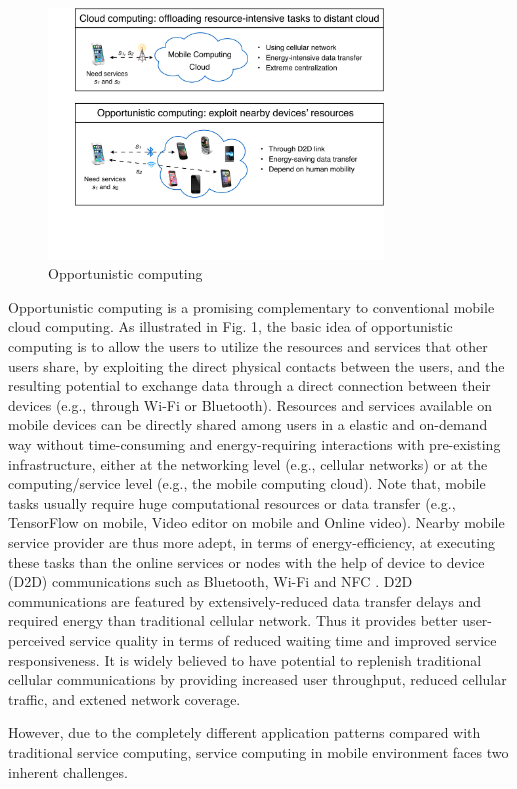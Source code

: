 \documentclass[journal]{IEEEtran}
\begin{document}
\begin{figure}[!t]
\centering
\includegraphics[width=3.5in]{./img/pic1.pdf}
\caption{Opportunistic computing}
\label{Opportunistic computing}
\end{figure}

Opportunistic computing is a promising complementary to conventional mobile cloud computing. As illustrated in Fig. 1, the basic idea of opportunistic computing is to allow the users to utilize the resources and services that other users share, by exploiting the direct physical contacts between the users, and the resulting potential to exchange data through a direct connection between their devices (e.g., through Wi-Fi or Bluetooth). Resources and services available on mobile devices can be directly shared among users in a elastic and on-demand way without time-consuming and energy-requiring interactions with pre-existing infrastructure, either at the networking level (e.g., cellular networks) or at the computing/service level (e.g., the mobile computing cloud). 
Note that, mobile tasks usually require huge computational resources or data transfer (e.g., TensorFlow on mobile, Video editor on mobile and Online video). Nearby mobile service provider are thus more adept, in terms of energy-efficiency, at executing these tasks than the online services or nodes with the help of device to device (D2D) communications such as Bluetooth, Wi-Fi and NFC \cite{balani2007energy}. D2D communications are featured by extensively-reduced data transfer delays and required energy than traditional cellular network. Thus it provides better user-perceived service quality in terms of reduced waiting time and improved service responsiveness. It is widely believed to have potential to replenish traditional cellular communications by providing increased user throughput, reduced cellular traffic, and extened network coverage.

However, due to the completely different application patterns compared with traditional service computing, service computing in mobile environment faces two inherent challenges.
\end{document}
